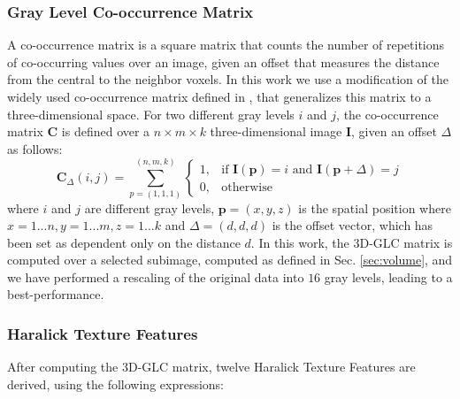 \subsubsection{Gray Level Co-occurrence Matrix}
A co-occurrence matrix is a square matrix that counts the number of repetitions of co-occurring values over an image, given an offset that measures the distance from the central to the neighbor voxels. In this work we use a modification of the widely used co-occurrence matrix defined in \cite{Philips2008}, that generalizes this matrix to a three-dimensional space. For two different gray levels $i$ and $j$, the co-occurrence matrix $\mathbf{C}$ is defined over a $n \times m \times k$ three-dimensional image $\mathbf{I}$, given an offset $\Delta$ as follows: 
\begin{equation}\label{eq:cooc3D}
\mathbf{C}_{\Delta}(i,j)=\sum_{p=(1,1,1)}^{(n,m,k)}\begin{cases} 1, & \mbox{if }\mathbf{I}(\mathbf{p})=i\mbox{ and }\mathbf{I}(\mathbf{p}+\Delta)=j \\ 0, & \mbox{otherwise}\end{cases}
\end{equation}
where $i$ and $j$ are different gray levels, $\mathbf{p}=(x,y,z)$ is the spatial position where $x=1...n, y=1...m, z=1...k$ and $\Delta=(d,d,d)$ is the offset vector, which  has been set as dependent only on the distance $d$. In this work, the 3D-GLC matrix is computed over a selected subimage, computed as defined in Sec. \ref{sec:volume}, and we have performed a rescaling of the original data into $16$ gray levels, leading to a best-performance.


\subsubsection{Haralick Texture Features}
After computing the 3D-GLC matrix, twelve Haralick Texture Features \cite{Haralick73} are derived, using the following expressions:

